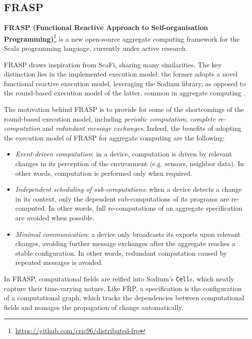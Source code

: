 \subsection{FRASP}

\textbf{FRASP (Functional Reactive Approach to Self-organisation Programming)}\footnote{\url{https://github.com/cric96/distributed-frp}}
is a new open-source aggregate computing framework for the Scala programming
language, currently under active research.

FRASP draws inspiration from \ac{ScaFi}, sharing many similarities. The key
distinction lies in the implemented execution model: the former adopts a novel
functional reactive execution model, leveraging the Sodium library, as opposed
to the round-based execution model of the latter, common in aggregate computing
\cite{FRASP}.

The motivation behind FRASP is to provide for some of the shortcomings of the
round-based execution model, including \textit{periodic computation},
\textit{complete re-computation} and \textit{redundant message exchanges}.
Indeed, the benefits of adopting the execution model of FRASP for aggregate
computing are the following:
\begin{itemize}
  \item \textit{Event-driven computation}: in a device, computation is driven
        by relevant changes in its perception of the environment (e.g.
        sensors, neighbor data). In other words, computation is performed only
        when required.
  \item \textit{Independent scheduling of sub-computations}: when a device
        detects a change in its context, only the dependent sub-computations
        of its programs are re-computed. In other words, full re-computations
        of an aggregate specification are avoided when possible.
  \item \textit{Minimal communication}: a device only broadcasts its exports
        upon relevant changes, avoiding further message exchanges after the
        aggregate reaches a stable configuration. In other words, redundant
        computation caused by repeated messages is avoided.
\end{itemize}

In FRASP, computational fields are reified into Sodium's \texttt{Cell}s, which
neatly capture their time-varying nature. Like \ac{FRP}, a specification is the
configuration of a computational graph, which tracks the dependencies between
computational fields and manages the propagation of change automatically.


